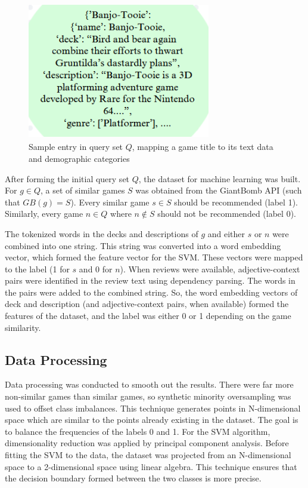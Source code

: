 \documentclass[10pt,twocolumn]{article}
\begin{document}

\begin{figure}[h!]
\includegraphics[width=8cm, height=6cm]{deck_desc_data_structure.PNG}
\centering
\caption{Sample entry in query set $Q$, mapping a game title to its text data and demographic categories}
\end{figure}

After forming the initial query set $Q$, the dataset for machine learning was built. For $g \in Q$, a set of similar games $S$ was obtained from the GiantBomb API (such that $GB(g) = S$). Every similar game $s \in S$ should be recommended (label 1). Similarly, every game $n \in Q$ where $n \not\in S$ should not be recommended (label 0). 

The tokenized words in the decks and descriptions of $g$ and either $s$ or $n$ were combined into one string. This string was converted into a word embedding vector, which formed the feature vector for the SVM. These vectors were mapped to the label (1 for $s$ and 0 for $n$). When reviews were available, adjective-context pairs were identified in the review text using dependency parsing. \cite{Meidl, LDiCaro} The words in the pairs were added to the combined string. So, the word embedding vectors of deck and description (and adjective-context pairs, when available) formed the features of the dataset, and the label was either 0 or 1 depending on the game similarity.

\subsection{Data Processing}
Data processing was conducted to smooth out the results. There were far more non-similar games than similar games, so synthetic minority oversampling was used to offset class imbalances. \cite{NVChawla} This technique generates points in N-dimensional space which are similar to the points already existing in the dataset. The goal is to balance the frequencies of the labels 0 and 1. For the SVM algorithm, dimensionality reduction was applied by principal component analysis. \cite{Joachims} Before fitting the SVM to the data, the dataset was projected from an N-dimensional space to a 2-dimensional space using linear algebra. This technique ensures that the decision boundary formed between the two classes is more precise.
\end{document}
